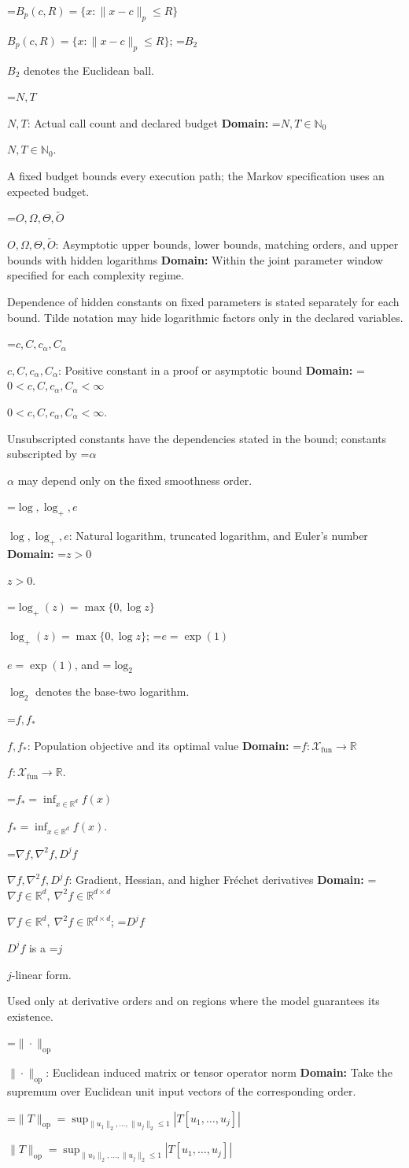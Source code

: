 \documentclass[10pt,a4paper]{article}
\newcommand{\AtlasMath}[1]{\par\begingroup\centering\setbox0=\hbox{$\displaystyle #1$}\ifdim\wd0>1.4\linewidth\typeout{ATLAS WIDE FORMULA: \the\wd0}\fi\ifdim\wd0>\linewidth\resizebox{\linewidth}{!}{\box0}\else\box0\fi\par\endgroup}
\newcommand{\AtlasInlineMath}[1]{\begingroup\setbox0=\hbox{$#1$}\ifdim\wd0>.4\linewidth\endgroup\AtlasMath{#1}\else\endgroup$#1$\fi}
\begin{document}
\AtlasInlineMath{B_p(c,R)=\{x:\|x-c\|_p\le R\}}; \AtlasInlineMath{B_2} denotes the Euclidean ball.

\AtlasInlineMath{N,T}: Actual call count and declared budget \textbf{Domain:} \AtlasInlineMath{N,T\in\mathbb{N}_0}.

A fixed budget bounds every execution path; the Markov specification uses an expected budget.

\AtlasInlineMath{O,\Omega,\Theta,\widetilde{O}}: Asymptotic upper bounds, lower bounds, matching orders, and upper bounds with hidden logarithms \textbf{Domain:} Within the joint parameter window specified for each complexity regime.

Dependence of hidden constants on fixed parameters is stated separately for each bound. Tilde notation may hide logarithmic factors only in the declared variables.

\AtlasInlineMath{c,C,c_\alpha,C_\alpha}: Positive constant in a proof or asymptotic bound \textbf{Domain:} \AtlasInlineMath{0<c,C,c_\alpha,C_\alpha<\infty}.

Unsubscripted constants have the dependencies stated in the bound; constants subscripted by \AtlasInlineMath{\alpha} may depend only on the fixed smoothness order.

\AtlasInlineMath{\log,\log_+,e}: Natural logarithm, truncated logarithm, and Euler's number \textbf{Domain:} \AtlasInlineMath{z>0}.

\AtlasInlineMath{\log_+(z)=\max\{0,\log z\}}; \AtlasInlineMath{e=\exp(1)}, and \AtlasInlineMath{\log_2} denotes the base-two logarithm.

\AtlasInlineMath{f,f_*}: Population objective and its optimal value \textbf{Domain:} \AtlasInlineMath{f:\mathcal{X}_{\mathrm{fun}}\to\mathbb{R}}.

\AtlasInlineMath{f_*=\inf_{x\in \mathbb{R}^d}f(x)}.

\AtlasInlineMath{\nabla f,\nabla^2f,D^jf}: Gradient, Hessian, and higher Fréchet derivatives \textbf{Domain:} \AtlasInlineMath{\nabla f\in\mathbb{R}^d,\ \nabla^2f\in\mathbb{R}^{d\times d}}; \AtlasInlineMath{D^jf} is a \AtlasInlineMath{j}-linear form.

Used only at derivative orders and on regions where the model guarantees its existence.

\AtlasInlineMath{\|\cdot\|_{\mathrm{op}}}: Euclidean induced matrix or tensor operator norm \textbf{Domain:} Take the supremum over Euclidean unit input vectors of the corresponding order.

\AtlasInlineMath{\|T\|_{\mathrm{op}}=\sup_{\|u_1\|_2,\ldots,\|u_j\|_2\le1}|T[u_1,\ldots,u_j]|}
\end{document}
